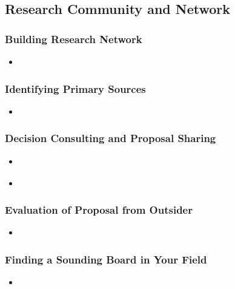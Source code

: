 \documentclass[11pt]{article}
\begin{document}
\subsection{Research Community and Network}
\subsubsection{Building Research Network}
\begin{itemize}
\item  \begin{exercise}
\end{exercise}
\end{itemize}
\subsubsection{Identifying Primary Sources}
\begin{itemize}
\item  \begin{exercise}
\end{exercise}
\end{itemize}
\subsubsection{Decision Consulting and Proposal Sharing}
\begin{itemize}
\item \begin{exercise}
\end{exercise}
\item \begin{exercise}
\end{exercise}
\end{itemize}
\subsubsection{Evaluation of Proposal from Outsider}
\begin{itemize}
\item \begin{exercise}
\end{exercise}
\end{itemize}
\subsubsection{Finding a Sounding Board in Your Field}
\begin{itemize}
\item \begin{exercise}
\end{exercise}
\end{itemize}
\end{document}
